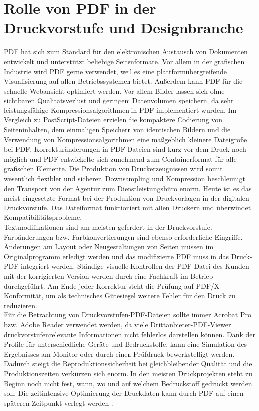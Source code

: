 \section{Rolle von PDF in der Druckvorstufe und Designbranche}
PDF hat sich zum Standard für den elektronischen Austausch von Dokumenten entwickelt und unterstützt beliebige Seitenformate. Vor allem in der grafischen Industrie wird PDF gerne verwendet, weil es eine plattformübergreifende Visualisierung auf allen Betriebssystemen bietet. Außerdem kann PDF für die schnelle Webansicht optimiert werden. Vor allem Bilder lassen sich ohne sichtbaren Qualitätsverlust und geringem Datenvolumen speichern, da sehr leistungsfähige Kompressionsalgorithmen in PDF implementiert wurden. Im Vergleich zu PostScript-Dateien erzielen die kompaktere Codierung von Seiteninhalten, dem einmaligen Speichern von identischen Bildern und die Verwendung von Kompressionsalgorithmen eine maßgeblich kleinere Dateigröße bei PDF. Korrekturänderungen in PDF-Dateien sind kurz vor dem Druck noch möglich und PDF entwickelte sich zunehmend zum Containerformat für alle grafischen Elemente. Die Produktion von Druckerzeugnissen wird somit wesentlich flexibler und sicherer. Downsampling und Kompression beschleunigt den Transport von der Agentur zum Dienstleistungsbüro enorm. Heute ist es das meist eingesetzte Format bei der Produktion von Druckvorlagen in der digitalen Druckvorstufe. Das Dateiformat funktioniert mit allen Druckern und überwindet Kompatibilitätsprobleme. \\
Textmodifikationen sind am meisten gefordert in der Druckvorstufe. Farbänderungen bzw. Farbkonvertierungen sind ebenso erforderliche Eingriffe. Änderungen am Layout oder Neugestaltungen von Seiten müssen im Originalprogramm erledigt werden und das modifizierte PDF muss in das Druck-PDF integriert werden. Ständige visuelle Kontrollen der PDF-Datei des Kunden mit der korrigierten Version werden durch eine Fachkraft im Betrieb durchgeführt. Am Ende jeder Korrektur steht die Prüfung auf PDF/X-Konformität, um als technisches Gütesiegel weitere Fehler für den Druck zu reduzieren. \\
Für die Betrachtung von Druckvorstufen-PDF-Dateien sollte immer Acrobat Pro bzw. Adobe Reader verwendet werden, da viele Drittanbieter-PDF-Viewer druckvorstufenrelevante Informationen nicht fehlerlos darstellen können. Dank der Profile für unterschiedliche Geräte und Bedruckstoffe, kann eine Simulation des Ergebnisses am Monitor oder durch einen Prüfdruck bewerkstelligt werden. Dadurch steigt die Reproduktionssicherheit bei gleichbleibender Qualität und die Produktionszeiten verkürzen sich enorm. In den meisten Druckprojekten steht zu Beginn noch nicht fest, wann, wo und auf welchem Bedruckstoff gedruckt werden soll. Die zeitintensive Optimierung der Druckdaten kann durch PDF auf einen späteren Zeitpunkt verlegt werden \cite{schneeberger}.
